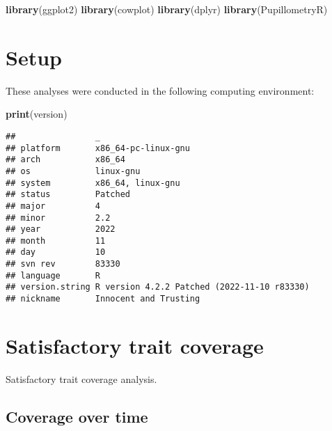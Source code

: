 \documentclass[]{book}
\newenvironment{Shaded}{\begin{snugshade}}{\end{snugshade}}
\newcommand{\KeywordTok}[1]{\textcolor[rgb]{0.13,0.29,0.53}{\textbf{#1}}}
\newcommand{\NormalTok}[1]{#1}
\begin{document}
\begin{Shaded}
\begin{Highlighting}[]
\KeywordTok{library}\NormalTok{(ggplot2)}
\KeywordTok{library}\NormalTok{(cowplot)}
\KeywordTok{library}\NormalTok{(dplyr)}
\KeywordTok{library}\NormalTok{(PupillometryR)}
\end{Highlighting}
\end{Shaded}

\hypertarget{setup-2}{%
\section{Setup}\label{setup-2}}

These analyses were conducted in the following computing environment:

\begin{Shaded}
\begin{Highlighting}[]
\KeywordTok{print}\NormalTok{(version)}
\end{Highlighting}
\end{Shaded}

\begin{verbatim}
##                _                                          
## platform       x86_64-pc-linux-gnu                        
## arch           x86_64                                     
## os             linux-gnu                                  
## system         x86_64, linux-gnu                          
## status         Patched                                    
## major          4                                          
## minor          2.2                                        
## year           2022                                       
## month          11                                         
## day            10                                         
## svn rev        83330                                      
## language       R                                          
## version.string R version 4.2.2 Patched (2022-11-10 r83330)
## nickname       Innocent and Trusting
\end{verbatim}

\hypertarget{satisfactory-trait-coverage}{%
\section{Satisfactory trait coverage}\label{satisfactory-trait-coverage}}

Satisfactory trait coverage analysis.

\hypertarget{coverage-over-time}{%
\subsection{Coverage over time}\label{coverage-over-time}}
\end{document}
